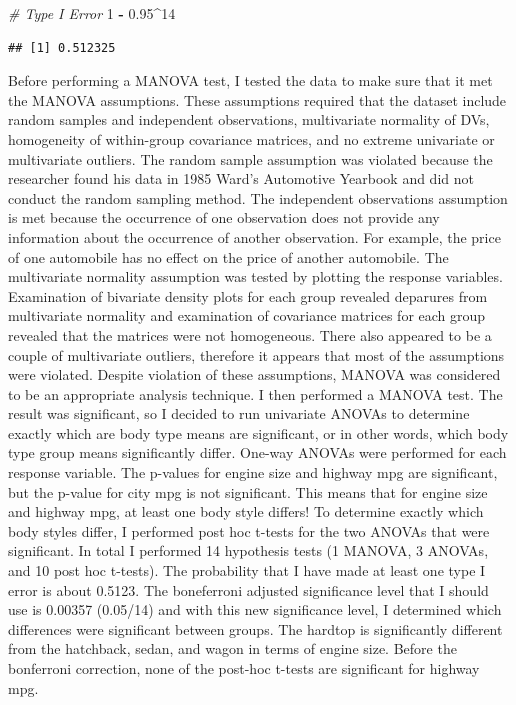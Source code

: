 \documentclass[]{article}
\newenvironment{Shaded}{\begin{snugshade}}{\end{snugshade}}
\newcommand{\DecValTok}[1]{\textcolor[rgb]{0.00,0.00,0.81}{#1}}
\newcommand{\FloatTok}[1]{\textcolor[rgb]{0.00,0.00,0.81}{#1}}
\newcommand{\StringTok}[1]{\textcolor[rgb]{0.31,0.60,0.02}{#1}}
\newcommand{\CommentTok}[1]{\textcolor[rgb]{0.56,0.35,0.01}{\textit{#1}}}
\newcommand{\OperatorTok}[1]{\textcolor[rgb]{0.81,0.36,0.00}{\textbf{#1}}}
\begin{document}
\begin{Shaded}
\begin{Highlighting}[]
\CommentTok{# Type I Error}
\DecValTok{1} \OperatorTok{-}\StringTok{ }\FloatTok{0.95}\OperatorTok{^}\DecValTok{14}
\end{Highlighting}
\end{Shaded}

\begin{verbatim}
## [1] 0.512325
\end{verbatim}

Before performing a MANOVA test, I tested the data to make sure that it
met the MANOVA assumptions. These assumptions required that the dataset
include random samples and independent observations, multivariate
normality of DVs, homogeneity of within-group covariance matrices, and
no extreme univariate or multivariate outliers. The random sample
assumption was violated because the researcher found his data in 1985
Ward's Automotive Yearbook and did not conduct the random sampling
method. The independent observations assumption is met because the
occurrence of one observation does not provide any information about the
occurrence of another observation. For example, the price of one
automobile has no effect on the price of another automobile. The
multivariate normality assumption was tested by plotting the response
variables. Examination of bivariate density plots for each group
revealed deparures from multivariate normality and examination of
covariance matrices for each group revealed that the matrices were not
homogeneous. There also appeared to be a couple of multivariate
outliers, therefore it appears that most of the assumptions were
violated. Despite violation of these assumptions, MANOVA was considered
to be an appropriate analysis technique. I then performed a MANOVA test.
The result was significant, so I decided to run univariate ANOVAs to
determine exactly which are body type means are significant, or in other
words, which body type group means significantly differ. One-way ANOVAs
were performed for each response variable. The p-values for engine size
and highway mpg are significant, but the p-value for city mpg is not
significant. This means that for engine size and highway mpg, at least
one body style differs! To determine exactly which body styles differ, I
performed post hoc t-tests for the two ANOVAs that were significant. In
total I performed 14 hypothesis tests (1 MANOVA, 3 ANOVAs, and 10 post
hoc t-tests). The probability that I have made at least one type I error
is about 0.5123. The boneferroni adjusted significance level that I
should use is 0.00357 (0.05/14) and with this new significance level, I
determined which differences were significant between groups. The
hardtop is significantly different from the hatchback, sedan, and wagon
in terms of engine size. Before the bonferroni correction, none of the
post-hoc t-tests are significant for highway mpg.
\end{document}
